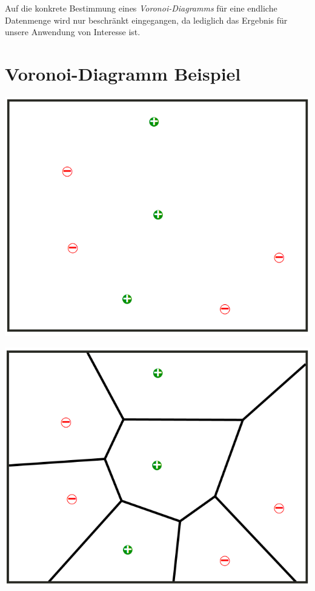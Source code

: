 \documentclass[fontsize=11pt]{scrartcl}
\newenvironment{Figure}
  {\par\medskip\noindent\minipage{\linewidth}}
  {\endminipage\par\medskip}
\begin{document}
            Auf die konkrete Bestimmung eines \emph{Voronoi-Diagramms} für eine endliche Datenmenge wird nur beschränkt eingegangen, da lediglich das Ergebnis für unsere Anwendung von Interesse ist. %
                        
        \section{Voronoi-Diagramm Beispiel}
            \begin{Figure}
                \begin{minipage}[b]{.4\linewidth}
                    \includegraphics[scale=0.3]{vor1.png}
                \end{minipage}
                \hspace{.1\linewidth}
                \begin{minipage}[b]{.4\linewidth}
                    \includegraphics[scale=0.3]{vor2.png}
                \end{minipage}
            \end{Figure}
\end{document}
